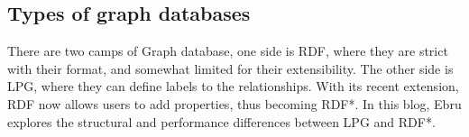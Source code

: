 \subsection{Types of graph databases}
There are two camps of Graph database, one side is RDF, where they are strict with their format, and somewhat limited for their extensibility. The other side is LPG, where they can define labels to the relationships. With its recent extension, RDF now allows users to add properties, thus becoming RDF*. In this blog, Ebru explores the structural and performance differences between LPG and RDF*.


